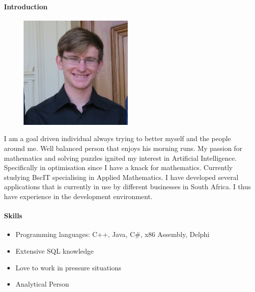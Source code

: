 \documentclass{article}
\begin{document}
        \paragraph{Introduction}
            \begin{figure}
              \begin{center}
                \vspace{-0.75cm}
                \includegraphics[width=0.5\textwidth]{img/marno.jpg}
              \end{center}
            \end{figure}
            I am a goal driven individual always trying to better myself and the people around me. Well balanced person that enjoys his morning runs. My passion for mathematics and solving puzzles ignited my interest in Artificial Intelligence. Specifically in optimisation since I have a knack for mathematics. Currently studying BscIT specialising in Applied Mathematics. I have developed several applications that is currently in use by different businesses in South Africa. I thus have experience in the development environment.   
        
        \paragraph{Skills}
            \begin{itemize}
                \item Programming languages: C++, Java, C\#, x86 Assembly, Delphi
                \item Extensive SQL knowledge
                \item Love to work in pressure situations
                \item Analytical Person
            \end{itemize}
            
\end{document}
